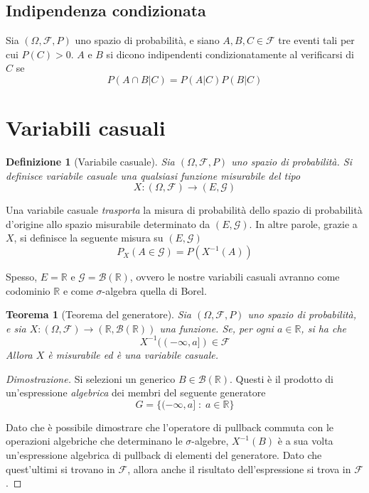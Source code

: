 \documentclass{article}
\newtheorem{theorem}{Teorema}
\newtheorem{definition}{Definizione}
\begin{document}
        \vspace{10pt}
        \subsection{Indipendenza condizionata}
            Sia $(\Omega, \mathcal{F}, P)$ uno spazio di probabilità, e siano $A, B, C \in \mathcal{F}$ tre eventi tali per cui $P(C) > 0$.
            $A$ e $B$ si dicono indipendenti condizionatamente al verificarsi di $C$ se
            \[
                P(A \cap B | C) = P(A | C)P(B | C)
            \]

            

    \newpage
    \section{Variabili casuali}
        \begin{definition}[Variabile casuale]
            Sia $(\Omega, \mathcal{F}, P)$ uno spazio di probabilità.
            Si definisce variabile casuale una qualsiasi funzione misurabile del tipo  
            \[
                X: (\Omega, \mathcal{F}) \rightarrow (E, \mathcal{G})
            \]
        \end{definition}

        Una variabile casuale \textit{trasporta} la misura di probabilità dello spazio di probabilità d'origine allo spazio misurabile determinato da $(E, \mathcal{G})$.
        In altre parole, grazie a $X$, si definisce la seguente misura su $(E, \mathcal{G})$
        \[
            P_{X}(A \in \mathcal{G}) = P(X^{-1}(A))
        \]

        Spesso, $E = \mathbb{R}$ e $\mathcal{G} = \mathcal{B}(\mathbb{R})$, ovvero le nostre variabili casuali avranno come codominio $\mathbb{R}$ e come $\sigma$-algebra quella di Borel.

        \begin{theorem}[Teorema del generatore]
            Sia $(\Omega, \mathcal{F}, P)$ uno spazio di probabilità, e sia $X: (\Omega, \mathcal{F}) \rightarrow (\mathbb{R}, \mathcal{B}(\mathbb{R}))$ una funzione.
            Se, per ogni $a \in \mathbb{R}$, si ha che
            \[
                X^{-1}((-\infty, a]) \in \mathcal{F}
            \]
            Allora $X$ è misurabile ed è una variabile casuale.
        \end{theorem}

        \begin{proof}[Dimostrazione]
            Si selezioni un generico $B \in \mathcal{B}(\mathbb{R})$.
            Questi è il prodotto di un'espressione \textit{algebrica} dei membri del seguente generatore
            \[
                G = \{(-\infty, a] \; : \; a \in \mathbb{R}\}
            \]

            Dato che è possibile dimostrare che l'operatore di pullback commuta con le operazioni algebriche che determinano le $\sigma$-algebre, $X^{-1}(B)$ è a sua volta un'espressione algebrica di pullback di elementi del generatore.
            Dato che quest'ultimi si trovano in $\mathcal{F}$, allora anche il risultato dell'espressione si trova in $\mathcal{F}$.
        \end{proof}
\end{document}
